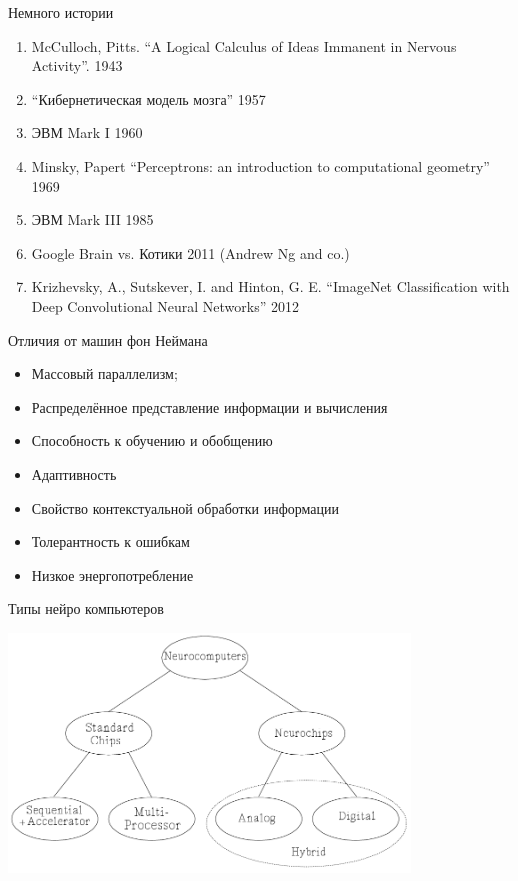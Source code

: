 \documentclass[14pt, fleqn, xcolor={dvipsnames, table}]{beamer}
\begin{document}
\begin{frame}{Немного истории}
\begin{enumerate}
  \item McCulloch, Pitts. ``A Logical Calculus of Ideas Immanent in Nervous Activity''. 1943
  \item ``Кибернетическая модель мозга'' 1957
  \item ЭВМ Mark I 1960
  \item Minsky, Papert ``Perceptrons: an introduction to computational geometry'' 1969
  \item ЭВМ Mark III 1985
  \item Google Brain vs. Котики 2011 (Andrew Ng and co.)
  \item Krizhevsky, A., Sutskever, I. and Hinton, G. E. ``ImageNet Classification with Deep Convolutional Neural Networks'' 2012
\end{enumerate}

\end{frame}

\begin{frame}{Отличия от машин фон Неймана}
\begin{itemize}
  \item Массовый параллелизм;
  \item Распределённое представление информации и вычисления
  \item Способность к обучению и обобщению
  \item Адаптивность
  \item Свойство контекстуальной обработки информации
  \item Толерантность к ошибкам
  \item Низкое энергопотребление
\end{itemize}
\end{frame}

\begin{frame}{Типы нейро компьютеров}
\begin{center}
\includegraphics[width=0.8\textwidth]{neurocomp-types}
\end{center}
\end{frame}
\end{document}
